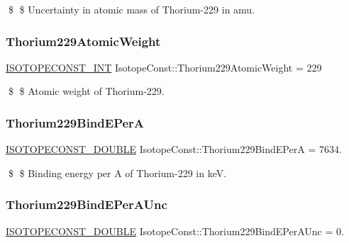 \$ \$ Uncertainty in atomic mass of Thorium-\/229 in amu. \mbox{\label{group___isotope_const-_thorium-_th229_ga2bcdceeb2dfe6381f6dcc06120c529a5}} 
\subsubsection{\texorpdfstring{Thorium229\+Atomic\+Weight}{Thorium229AtomicWeight}}
{\footnotesize\ttfamily \mbox{\hyperlink{group___isotope_const-_macros_ga5f18360b3e99483a35c32d789e62621c}{I\+S\+O\+T\+O\+P\+E\+C\+O\+N\+S\+T\+\_\+\+I\+NT}} Isotope\+Const\+::\+Thorium229\+Atomic\+Weight = 229}

\$ \$ Atomic weight of Thorium-\/229. \mbox{\label{group___isotope_const-_thorium-_th229_ga026b1c777331f5425ed547412cfe5a6e}} 
\subsubsection{\texorpdfstring{Thorium229\+Bind\+E\+PerA}{Thorium229BindEPerA}}
{\footnotesize\ttfamily \mbox{\hyperlink{group___isotope_const-_macros_ga8f45a7272ce02c0b4c65c44636ed719a}{I\+S\+O\+T\+O\+P\+E\+C\+O\+N\+S\+T\+\_\+\+D\+O\+U\+B\+LE}} Isotope\+Const\+::\+Thorium229\+Bind\+E\+PerA = 7634.}

\$ \$ Binding energy per A of Thorium-\/229 in keV. \mbox{\label{group___isotope_const-_thorium-_th229_gaa24361ae64763fa971c2ee137a9ccffe}} 
\subsubsection{\texorpdfstring{Thorium229\+Bind\+E\+Per\+A\+Unc}{Thorium229BindEPerAUnc}}
{\footnotesize\ttfamily \mbox{\hyperlink{group___isotope_const-_macros_ga8f45a7272ce02c0b4c65c44636ed719a}{I\+S\+O\+T\+O\+P\+E\+C\+O\+N\+S\+T\+\_\+\+D\+O\+U\+B\+LE}} Isotope\+Const\+::\+Thorium229\+Bind\+E\+Per\+A\+Unc = 0.}

